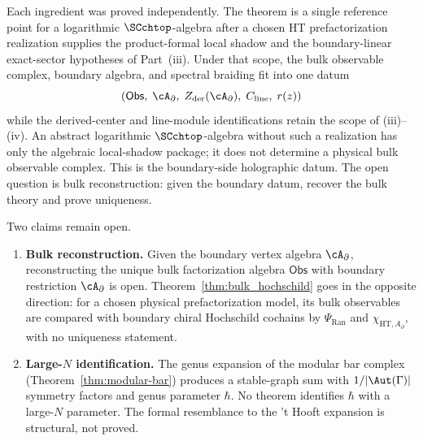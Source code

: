 \begin{remark}
Each ingredient was proved independently. The theorem is a single
reference point for a logarithmic $\SCchtop$-algebra after a chosen
HT prefactorization realization supplies the product-formal local
shadow and the boundary-linear exact-sector hypotheses of
Part~\textup{(iii)}. Under that scope, the bulk observable complex,
boundary algebra, and spectral braiding fit into one datum
\[
(\mathsf{Obs},\; \cA_\partial,\;
Z_{\mathrm{der}}(\cA_\partial),\;
C_{\mathrm{line}},\; r(z))
\]
while the derived-center and line-module identifications retain the
scope of \textup{(iii)}--\textup{(iv)}. An abstract logarithmic
$\SCchtop$-algebra without such a realization has only the algebraic
local-shadow package; it does not determine a physical bulk
observable complex. This is the boundary-side holographic datum.
The open question is bulk reconstruction: given the boundary datum,
recover the bulk theory and prove uniqueness.
\end{remark}

\begin{remark}
Two claims remain open.
\begin{enumerate}[leftmargin=2.4em]
\item \textbf{Bulk reconstruction.} Given the boundary vertex
 algebra $\cA_\partial$, reconstructing the unique
 bulk factorization algebra $\mathsf{Obs}$ with boundary restriction
 $\cA_\partial$ is open.
 Theorem~\ref{thm:bulk_hochschild} goes in the opposite direction:
 for a chosen physical prefactorization model, its bulk observables are
 compared with boundary chiral Hochschild cochains by
 \(\Psi_{\mathrm{Ran}}\) and \(\chi_{\mathrm{HT},A_\partial}\), with
 no uniqueness statement.
\item \textbf{Large-$N$ identification.} The genus expansion
 of the modular bar complex (Theorem~\ref{thm:modular-bar})
 produces a stable-graph sum with $1/|\Aut(\Gamma)|$ symmetry
 factors and genus parameter $\hbar$. No theorem identifies $\hbar$ with a large-$N$ parameter.
 The formal resemblance to the 't Hooft expansion is structural,
 not proved.
\end{enumerate}
\end{remark}

